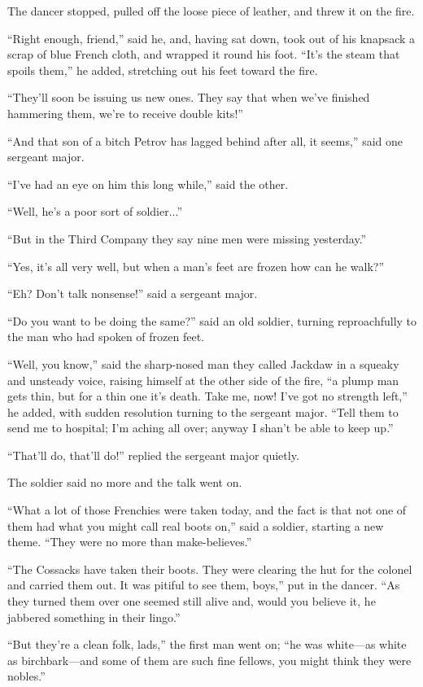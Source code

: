 The dancer stopped, pulled off the loose piece of leather, and
threw it on the fire.

``Right enough, friend,'' said he, and, having sat down, took out
of his knapsack a scrap of blue French cloth, and wrapped it
round his foot.  ``It's the steam that spoils them,'' he added,
stretching out his feet toward the fire.

``They'll soon be issuing us new ones. They say that when we've
finished hammering them, we're to receive double kits!''

``And that son of a bitch Petrov has lagged behind after all, it
seems,'' said one sergeant major.

``I've had an eye on him this long while,'' said the other.

``Well, he's a poor sort of soldier...''

``But in the Third Company they say nine men were missing
yesterday.''

``Yes, it's all very well, but when a man's feet are frozen how
can he walk?''

``Eh? Don't talk nonsense!'' said a sergeant major.

``Do you want to be doing the same?'' said an old soldier,
turning reproachfully to the man who had spoken of frozen feet.

``Well, you know,'' said the sharp-nosed man they called Jackdaw
in a squeaky and unsteady voice, raising himself at the other
side of the fire, ``a plump man gets thin, but for a thin one
it's death. Take me, now! I've got no strength left,'' he added,
with sudden resolution turning to the sergeant major. ``Tell them
to send me to hospital; I'm aching all over; anyway I shan't be
able to keep up.''

``That'll do, that'll do!'' replied the sergeant major quietly.

The soldier said no more and the talk went on.

``What a lot of those Frenchies were taken today, and the fact is
that not one of them had what you might call real boots on,''
said a soldier, starting a new theme. ``They were no more than
make-believes.''

``The Cossacks have taken their boots. They were clearing the hut
for the colonel and carried them out. It was pitiful to see them,
boys,'' put in the dancer. ``As they turned them over one seemed
still alive and, would you believe it, he jabbered something in
their lingo.''

``But they're a clean folk, lads,'' the first man went on; ``he
was white---as white as birchbark---and some of them are such
fine fellows, you might think they were nobles.''

